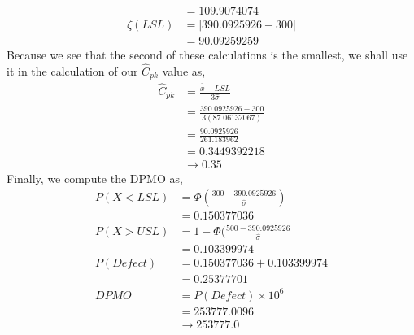 \documentclass[letterpaper,10pt]{article}
\begin{document}
\begin{enumerate}
\begin{align*}
&= 109.9074074\\
\zeta(LSL) &= |390.0925926-300|\\
&=90.09259259
\end{align*}
Because we see that the second of these calculations is the smallest, we shall use it in the calculation of our $\hat{C}_{pk}$ value as,
\begin{align*}
\hat{C}_{pk} &= \frac{\bar{\bar{x}}-LSL}{3\hat{\sigma}}\\
&=\frac{390.0925926-300}{3(87.06132067)}\\
&=\frac{90.0925926}{261.183962}\\
&=0.3449392218\\
&\to 0.35
\end{align*}
Finally, we compute the DPMO as,
\begin{align*}
P(X<LSL) &=\Phi(\frac{300-390.0925926}{\hat{\sigma}})\\
&=0.150377036\\
P(X>USL) &= 1-\Phi(\frac{500-390.0925926}{\hat{\sigma}}\\
&=0.103399974\\
P(Defect) &= 0.150377036+0.103399974\\
&=0.25377701\\
DPMO &= P(Defect)\times 10^6\\
&=253777.0096\\
&\to 253777.0
\end{align*}
\end{enumerate}
\end{document}
